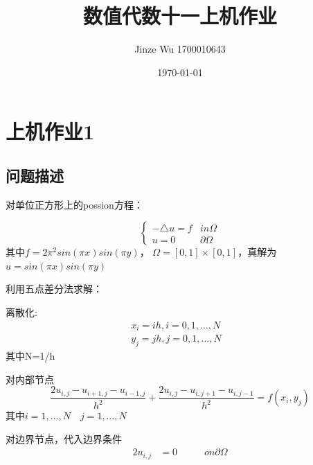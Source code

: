 \documentclass[withoutpreface,bwprint]{cumcmthesis}
\title{数值代数十一上机作业}
\date{\today}
\author{Jinze Wu 1700010643}
\begin{document}
\maketitle
\section{上机作业1}
\subsection{问题描述}
对单位正方形上的possion方程：

\begin{equation}
\left\{
\begin{array}    {lr}    
   -\triangle u =f & in    \Omega  \\     
        u=0        & \partial \Omega        
      \end{array}
\right.
\end{equation}
其中$f=2\pi^{2}sin(\pi x)sin(\pi y)$， $\Omega=[0,1]\times[0,1]$，真解为$u=sin(\pi x)sin(\pi y)$

利用五点差分法求解：

离散化:
\begin{align}
x_i=ih,i=0,1,\dots,N &\\
y_j=jh,j=0,1,\dots,N
\end{align}
其中N=1/h

对内部节点
\begin{equation}
\frac{2u_{i,j}-u_{i+1,j}-u_{i-1,j}}{h^{2}}+\frac{2u_{i,j}-u_{i,j+1}-u_{i,j-1}}{h^{2}}=f(x_{i},y_{j})
\end{equation}
其中$i=1,\dots,N\quad j=1,\dots,N$

对边界节点，代入边界条件
\begin{alignat}{2}
u_{i,j} & = 0 & \qquad on\partial \Omega 
\end{alignat}
\end{document}
